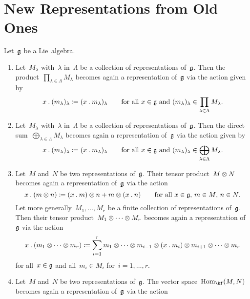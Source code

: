 \section{New Representations from Old Ones}


\begin{proposition}
	\label{new representations from old ones}
	Let~$\mathfrak{g}$ be a Lie~algebra.
	\begin{enumerate}
		\item
			Let~$M_\lambda$ with~$\lambda$ in~$\Lambda$ be a collection of representations of~$\mathfrak{g}$.
			Then the product~$\prod_{\lambda \in \Lambda} M_\lambda$ becomes again a representation of~$\mathfrak{g}$ via the action given by
			\[
				x \mathbin{.} (m_\lambda)_\lambda
				\coloneqq
				( x \mathbin{.} m_\lambda )_\lambda
				\qquad
				\text{for all~$x \in \mathfrak{g}$ and~$(m_\lambda)_\lambda \in \prod_{\lambda \in \Lambda} M_\lambda$.}
			\]
		\item
			Let~$M_\lambda$ with~$\lambda$ in~$\Lambda$ be a collection of representations of~$\mathfrak{g}$.
			Then the direct sum~$\bigoplus_{\lambda \in \Lambda} M_\lambda$ becomes again a representation of~$\mathfrak{g}$ via the action given by
			\[
				x \mathbin{.} (m_\lambda)_\lambda
				\coloneqq
				( x \mathbin{.} m_\lambda )_\lambda
				\qquad
				\text{for all~$x \in \mathfrak{g}$ and~$(m_\lambda)_\lambda \in \bigoplus_{\lambda \in \Lambda} M_\lambda$.}
			\]
		\item
			Let~$M$ and~$N$ be two representations of~$\mathfrak{g}$.
			Their tensor product~$M \otimes N$ becomes again a representation of~$\mathfrak{g}$ via the action
			\[
				x \mathbin{.} (m \otimes n)
				\coloneqq
				(x \mathbin{.} m) \otimes n + m \otimes (x \mathbin{.} n)
				\qquad
				\text{for all~$x \in \mathfrak{g}$,~$m \in M$,~$n \in N$.}
			\]
			Let more generally~$M_1, \dotsc, M_r$ be a finite collection of representations of~$\mathfrak{g}$.
			Then their tensor product~$M_1 \otimes \dotsb \otimes M_r$ becomes again a representation of~$\mathfrak{g}$ via the action
			\[
				x \mathbin{.} (m_1 \otimes \dotsb \otimes m_r)
				\coloneqq
				\sum_{i=1}^r
								m_1
				\otimes \dotsb
				\otimes m_{i-1}
				\otimes (x \mathbin{.} m_i)
				\otimes m_{i+1}
				\otimes \dotsb
				\otimes m_r
			\]
			for all~$x \in \mathfrak{g}$ and all~$m_i \in M_i$ for~$i = 1, \dotsc, r$.
		\item
			Let~$M$ and~$N$ be two representations of~$\mathfrak{g}$.
			The vector space~$\Hom_{\kf}(M,N)$ becomes again a representation of~$\mathfrak{g}$ via the action

\end{enumerate}
\end{proposition}
